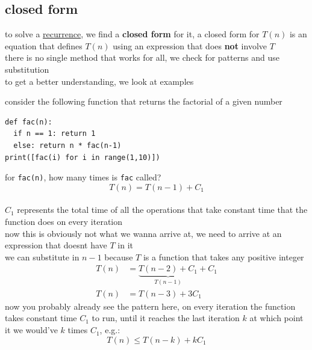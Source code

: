 \documentclass[a4paper,12pt]{article}
\begin{document}
\subsection{closed form}
\label{sec:orgadc62d6}
to solve a \hyperref[sec:org4c65e1c]{recurrence}, we find a \textbf{closed form} for it, a closed form for \(T(n)\) is an equation that defines \(T(n)\) using an expression that does \textbf{not} involve \(T\)\\
there is no single method that works for all, we check for patterns and use substitution\\
to get a better understanding, we look at examples\\

\begin{my_example}
consider the following function that returns the factorial of a given number\\
\lstset{language=Python,label= ,caption= ,captionpos=b,numbers=none}
\begin{lstlisting}
def fac(n):
  if n == 1: return 1
  else: return n * fac(n-1)
print([fac(i) for i in range(1,10)])
\end{lstlisting}

for \texttt{fac(n)}, how many times is \texttt{fac} called?\\
\[ T(n) = T(n-1) + C_1 \]\\
\(C_1\) represents the total time of all the operations that take constant time that the function does on every iteration\\
now this is obviously not what we wanna arrive at, we need to arrive at an expression that doesnt have \(T\) in it\\
we can substitute in \(n - 1\) because \(T\) is a function that takes any positive integer\\
\begin{align*}
  T(n) &= \underbrace{T(n-2) + C_1}_{T(n-1)} + C_1\\
  T(n) &= T(n-3) + 3C_1
\end{align*}
now you probably already see the pattern here, on every iteration the function takes constant time \(C_1\) to run, until it reaches the last iteration \(k\) at which point it we would've \(k\) times \(C_1\), e.g.:\\
\[ T(n) \leq T(n-k) + kC_1 \]\\


\end{my_example}
\end{document}
